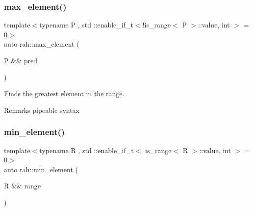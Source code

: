 \subsubsection{\texorpdfstring{max\_element()}{max\_element()}\hspace{0.1cm}{\footnotesize\ttfamily [4/4]}}
{\footnotesize\ttfamily template$<$typename P , std \+::enable\+\_\+if\+\_\+t$<$!is\+\_\+range$<$ P $>$\+::value, int $>$  = 0$>$ \\
auto rah\+::max\+\_\+element (\begin{DoxyParamCaption}\item[{P \&\&}]{pred }\end{DoxyParamCaption})}



Finds the greatest element in the range. 

\begin{DoxyRemark}{Remarks}
pipeable syntax
\end{DoxyRemark}

\begin{DoxyCodeInclude}{0}
\end{DoxyCodeInclude}
\mbox{\label{namespacerah_ac30d42caf315f29ed784dd3c4f46d533}} 
\subsubsection{\texorpdfstring{min\_element()}{min\_element()}\hspace{0.1cm}{\footnotesize\ttfamily [1/4]}}
{\footnotesize\ttfamily template$<$typename R , std \+::enable\+\_\+if\+\_\+t$<$ is\+\_\+range$<$ R $>$\+::value, int $>$  = 0$>$ \\
auto rah\+::min\+\_\+element (\begin{DoxyParamCaption}\item[{R \&\&}]{range }\end{DoxyParamCaption})}



